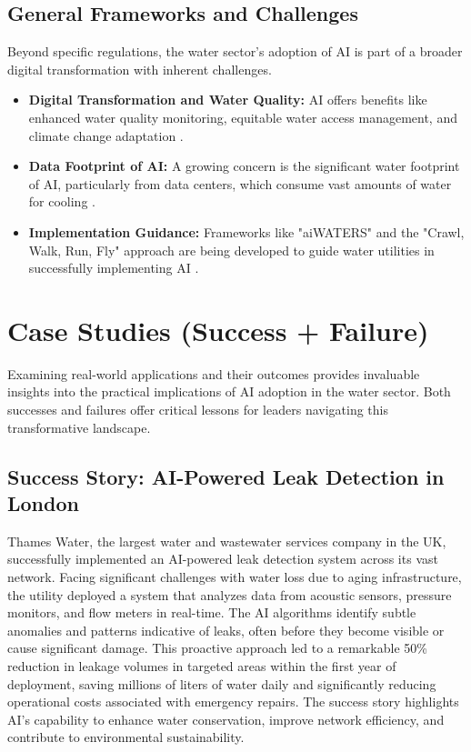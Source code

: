 \subsection{General Frameworks and Challenges}
Beyond specific regulations, the water sector's adoption of AI is part of a broader digital transformation with inherent challenges.
\begin{itemize}
    \item \textbf{Digital Transformation and Water Quality:} AI offers benefits like enhanced water quality monitoring, equitable water access management, and climate change adaptation \cite{ResearchGate_General, FidoTech_General}.
    \item \textbf{Data Footprint of AI:} A growing concern is the significant water footprint of AI, particularly from data centers, which consume vast amounts of water for cooling \cite{Illinois_General}.
    \item \textbf{Implementation Guidance:} Frameworks like "aiWATERS" and the "Crawl, Walk, Run, Fly" approach are being developed to guide water utilities in successfully implementing AI \cite{WaterRF_General, YouTube_General}.\end{itemize}

\section{Case Studies (Success + Failure)}

Examining real-world applications and their outcomes provides invaluable insights into the practical implications of AI adoption in the water sector. Both successes and failures offer critical lessons for leaders navigating this transformative landscape.

\subsection{Success Story: AI-Powered Leak Detection in London}
Thames Water, the largest water and wastewater services company in the UK, successfully implemented an AI-powered leak detection system across its vast network. Facing significant challenges with water loss due to aging infrastructure, the utility deployed a system that analyzes data from acoustic sensors, pressure monitors, and flow meters in real-time. The AI algorithms identify subtle anomalies and patterns indicative of leaks, often before they become visible or cause significant damage. This proactive approach led to a remarkable 50\% reduction in leakage volumes in targeted areas within the first year of deployment, saving millions of liters of water daily and significantly reducing operational costs associated with emergency repairs. The success story highlights AI's capability to enhance water conservation, improve network efficiency, and contribute to environmental sustainability.

